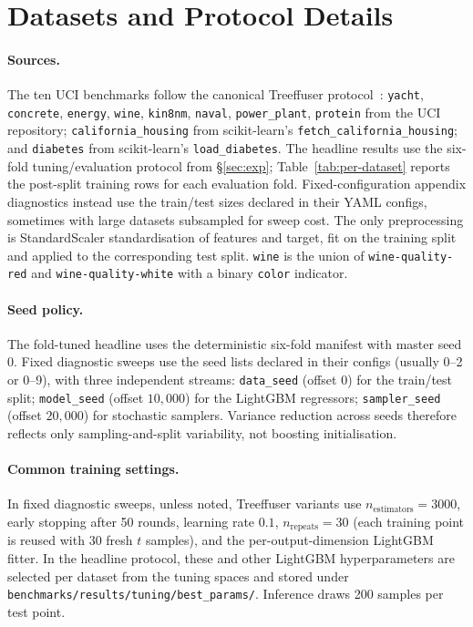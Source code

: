 \documentclass{tpm2026}
\begin{document}
\section{Datasets and Protocol Details}\label{app:datasets}

\paragraph{Sources.} The ten UCI benchmarks follow the canonical Treeffuser protocol~\citep{treeffuser}: \texttt{yacht}, \texttt{concrete}, \texttt{energy}, \texttt{wine}, \texttt{kin8nm}, \texttt{naval}, \texttt{power\_plant}, \texttt{protein} from the UCI repository; \texttt{california\_housing} from scikit-learn's \texttt{fetch\_california\_housing}; and \texttt{diabetes} from scikit-learn's \texttt{load\_diabetes}. The headline results use the six-fold tuning/evaluation protocol from \S\ref{sec:exp}; Table~\ref{tab:per-dataset} reports the post-split training rows for each evaluation fold. Fixed-configuration appendix diagnostics instead use the train/test sizes declared in their YAML configs, sometimes with large datasets subsampled for sweep cost. The only preprocessing is StandardScaler standardisation of features and target, fit on the training split and applied to the corresponding test split. \texttt{wine} is the union of \texttt{wine-quality-red} and \texttt{wine-quality-white} with a binary \texttt{color} indicator.

\paragraph{Seed policy.} The fold-tuned headline uses the deterministic six-fold manifest with master seed 0. Fixed diagnostic sweeps use the seed lists declared in their configs (usually 0--2 or 0--9), with three independent streams: \texttt{data\_seed} (offset 0) for the train/test split; \texttt{model\_seed} (offset $10{,}000$) for the LightGBM regressors; \texttt{sampler\_seed} (offset $20{,}000$) for stochastic samplers. Variance reduction across seeds therefore reflects only sampling-and-split variability, not boosting initialisation.

\paragraph{Common training settings.} In fixed diagnostic sweeps, unless noted, Treeffuser variants use $n_{\text{estimators}}=3000$, early stopping after 50 rounds, learning rate $0.1$, $n_{\text{repeats}}=30$ (each training point is reused with 30 fresh $t$ samples), and the per-output-dimension LightGBM fitter. In the headline protocol, these and other LightGBM hyperparameters are selected per dataset from the tuning spaces and stored under \texttt{benchmarks/results/tuning/best\_params/}. Inference draws 200 samples per test point.
\end{document}

